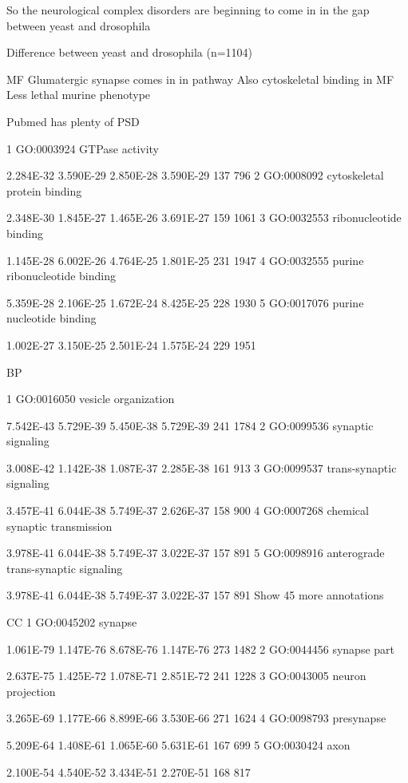 So the neurological complex disorders are beginning to come in in the gap between yeast and drosophila



Difference between yeast and drosophila (n=1104)

MF
Glumatergic synapse comes in in pathway
Also cytoskeletal binding in MF
Less lethal murine phenotype
	
Pubmed has plenty of PSD

1 
GO:0003924 
GTPase activity 

2.284E-32 
3.590E-29 
2.850E-28 
3.590E-29 
137 
796 
2 
GO:0008092 
cytoskeletal protein binding 

2.348E-30 
1.845E-27 
1.465E-26 
3.691E-27 
159 
1061 
3 
GO:0032553 
ribonucleotide binding 

1.145E-28 
6.002E-26 
4.764E-25 
1.801E-25 
231 
1947 
4 
GO:0032555 
purine ribonucleotide binding 

5.359E-28 
2.106E-25 
1.672E-24 
8.425E-25 
228 
1930 
5 
GO:0017076 
purine nucleotide binding 

1.002E-27 
3.150E-25 
2.501E-24 
1.575E-24 
229 
1951

BP


1 
GO:0016050 
vesicle organization 

7.542E-43 
5.729E-39 
5.450E-38 
5.729E-39 
241 
1784 
2 
GO:0099536 
synaptic signaling 

3.008E-42 
1.142E-38 
1.087E-37 
2.285E-38 
161 
913 
3 
GO:0099537 
trans-synaptic signaling 

3.457E-41 
6.044E-38 
5.749E-37 
2.626E-37 
158 
900 
4 
GO:0007268 
chemical synaptic transmission 

3.978E-41 
6.044E-38 
5.749E-37 
3.022E-37 
157 
891 
5 
GO:0098916 
anterograde trans-synaptic signaling 

3.978E-41 
6.044E-38 
5.749E-37 
3.022E-37 
157 
891 
Show 45 more annotations


CC
1 
GO:0045202 
synapse 

1.061E-79 
1.147E-76 
8.678E-76 
1.147E-76 
273 
1482 
2 
GO:0044456 
synapse part 

2.637E-75 
1.425E-72 
1.078E-71 
2.851E-72 
241 
1228 
3 
GO:0043005 
neuron projection 

3.265E-69 
1.177E-66 
8.899E-66 
3.530E-66 
271 
1624 
4 
GO:0098793 
presynapse 

5.209E-64 
1.408E-61 
1.065E-60 
5.631E-61 
167 
699 
5 
GO:0030424 
axon 

2.100E-54 
4.540E-52 
3.434E-51 
2.270E-51 
168 
817


